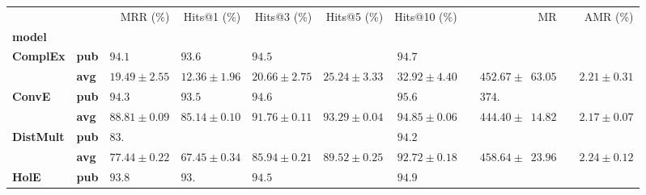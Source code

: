 \begin{tabular}{llrrrrrrr}
\toprule
       &     &                    MRR (\%) &                 Hits@1 (\%) &                 Hits@3 (\%) &                 Hits@5 (\%) &                Hits@10 (\%) &                                         MR &                     AMR (\%) \\
\textbf{model} & {} &                             &                             &                             &                             &                             &                                            &                              \\
\midrule
\textbf{ComplEx} & \textbf{pub} &  $94.1\phantom{0 \pm 0.00}$ &  $93.6\phantom{0 \pm 0.00}$ &  $94.5\phantom{0 \pm 0.00}$ &                             &  $94.7\phantom{0 \pm 0.00}$ &                                            &                              \\
       & \textbf{avg} &            $19.49 \pm 2.55$ &            $12.36 \pm 1.96$ &            $20.66 \pm 2.75$ &            $25.24 \pm 3.33$ &            $32.92 \pm 4.40$ &  $\phantom{00}452.67 \pm \phantom{0}63.05$ &  $\phantom{00}2.21 \pm 0.31$ \\
\textbf{ConvE} & \textbf{pub} &  $94.3\phantom{0 \pm 0.00}$ &  $93.5\phantom{0 \pm 0.00}$ &  $94.6\phantom{0 \pm 0.00}$ &                             &  $95.6\phantom{0 \pm 0.00}$ &  $\phantom{00}374.\phantom{00 \pm 000.00}$ &                              \\
       & \textbf{avg} &            $88.81 \pm 0.09$ &            $85.14 \pm 0.10$ &            $91.76 \pm 0.11$ &            $93.29 \pm 0.04$ &            $94.85 \pm 0.06$ &  $\phantom{00}444.40 \pm \phantom{0}14.82$ &  $\phantom{00}2.17 \pm 0.07$ \\
\textbf{DistMult} & \textbf{pub} &  $83.\phantom{00 \pm 0.00}$ &                             &                             &                             &  $94.2\phantom{0 \pm 0.00}$ &                                            &                              \\
       & \textbf{avg} &            $77.44 \pm 0.22$ &            $67.45 \pm 0.34$ &            $85.94 \pm 0.21$ &            $89.52 \pm 0.25$ &            $92.72 \pm 0.18$ &  $\phantom{00}458.64 \pm \phantom{0}23.96$ &  $\phantom{00}2.24 \pm 0.12$ \\
\textbf{HolE} & \textbf{pub} &  $93.8\phantom{0 \pm 0.00}$ &  $93.\phantom{00 \pm 0.00}$ &  $94.5\phantom{0 \pm 0.00}$ &                             &  $94.9\phantom{0 \pm 0.00}$ &                                            &                              \\

\end{tabular}
